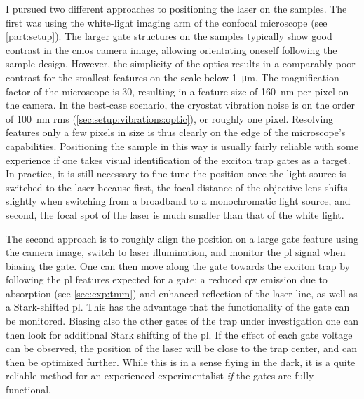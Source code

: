 I pursued two different approaches to positioning the laser on the samples.
The first was using the white-light imaging arm of the confocal microscope (see \cref{part:setup}).
The larger gate structures on the samples typically show good contrast in the \gls{cmos} camera image, allowing orientating oneself following the sample design.
However, the simplicity of the optics
results in a comparably poor contrast for the smallest features on the scale below \qty{1}{\micro\meter}.
The magnification factor of the microscope is \num{30}, resulting in a feature size of \qty{160}{\nano\meter} per pixel on the camera.
In the best-case scenario, the cryostat vibration noise is on the order of \qty{100}{\nano\meter} \gls{rms} (\cref{sec:setup:vibrations:optic}), or roughly one pixel.
Resolving features only a few pixels in size is thus clearly on the edge of the microscope's capabilities.
Positioning the sample in this way is usually fairly reliable with some experience if one takes visual identification of the exciton trap gates as a target.
In practice, it is still necessary to fine-tune the position once the light source is switched to the laser because first, the focal distance of the objective lens shifts slightly when switching from a broadband to a monochromatic light source, and second, the focal spot of the laser is much smaller than that of the white light.

The second approach is to roughly align the position on a large gate feature using the camera image, switch to laser illumination, and monitor the \gls{pl} signal when biasing the gate.
One can then move along the gate towards the exciton trap by following the \gls{pl} features expected for a gate: a reduced \gls{qw} emission due to absorption (see \cref{sec:exp:tmm}) and enhanced reflection of the laser line, as well as a Stark-shifted \gls{pl}.
This has the advantage that the functionality of the gate can be monitored.
Biasing also the other gates of the trap under investigation one can then look for additional Stark shifting of the \gls{pl}.
If the effect of each gate voltage can be observed, the position of the laser will be close to the trap center, and can then be optimized further.
While this is in a sense flying in the dark, it is a quite reliable method for an experienced experimentalist \emph{if} the gates are fully functional.

